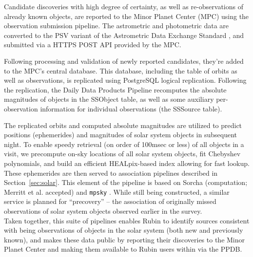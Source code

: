 Candidate discoveries with high degree of certainty, as well as re-observations of already known objects, are reported to the Minor Planet Center (MPC) using the observation submission pipeline.
The astrometric and photometric data are converted to the PSV variant of the Astrometric Data Exchange Standard \citep[ADES;][]{2017DPS....4911214C}, and submitted via a HTTPS POST API provided by the MPC.

Following processing and validation of newly reported candidates, they're added to the MPC's central database.
This database, including the table of orbits as well as observations, is replicated using PostgreSQL logical replication.
Following the replication, the Daily Data Products Pipeline recomputes the absolute magnitudes of objects in the SSObject table, as well as some auxiliary per-observation information for individual observations (the SSSource table).

The replicated orbits and computed absolute magnitudes are utilized to predict positions (ephemerides) and magnitudes of solar system objects in subsequent night.
To enable speedy retrieval (on order of 100msec or less) of all objects in a visit, we precompute on-sky locations of all solar system objects, fit Chebyshev polynomials, and build an efficient HEALpix-based index allowing for fast lookup.
These ephemerides are then served to association pipelines described in Section~\ref{sec:solar}.
This element of the pipeline is based on Sorcha (computation; Merritt et al. accepted) and \texttt{mpsky} \citep[fast lookup and serving;][]{mpsky}.
While still being constructed, a similar service is planned for ``precovery'' -- the association of originally missed observations of solar system objects observed earlier in the survey.
\\

Taken together, this suite of pipelines enables Rubin to identify sources consistent with being observations of objects in the solar system (both new and previously known), and makes these data public by reporting their discoveries to the Minor Planet Center and making them available to Rubin users within via the PPDB.
